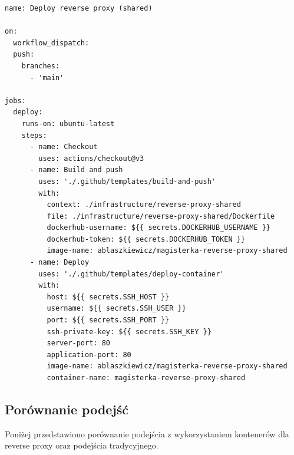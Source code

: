 \documentclass{article}
\begin{document}
\begin{lstlisting}[caption=Plik \texttt{.github/workflows/shared-deploy-reverse-proxy.yml}]
name: Deploy reverse proxy (shared)

on:
  workflow_dispatch:
  push:
    branches:
      - 'main'

jobs:
  deploy:
    runs-on: ubuntu-latest
    steps:
      - name: Checkout
        uses: actions/checkout@v3
      - name: Build and push
        uses: './.github/templates/build-and-push'
        with:
          context: ./infrastructure/reverse-proxy-shared
          file: ./infrastructure/reverse-proxy-shared/Dockerfile
          dockerhub-username: ${{ secrets.DOCKERHUB_USERNAME }}
          dockerhub-token: ${{ secrets.DOCKERHUB_TOKEN }}
          image-name: ablaszkiewicz/magisterka-reverse-proxy-shared
      - name: Deploy
        uses: './.github/templates/deploy-container'
        with:
          host: ${{ secrets.SSH_HOST }}
          username: ${{ secrets.SSH_USER }}
          port: ${{ secrets.SSH_PORT }}
          ssh-private-key: ${{ secrets.SSH_KEY }}
          server-port: 80
          application-port: 80
          image-name: ablaszkiewicz/magisterka-reverse-proxy-shared
          container-name: magisterka-reverse-proxy-shared

\end{lstlisting}

\subsection{Porównanie podejść}

Poniżej przedstawiono porównanie podejścia z wykorzystaniem kontenerów dla reverse proxy oraz podejścia tradycyjnego.
\end{document}
